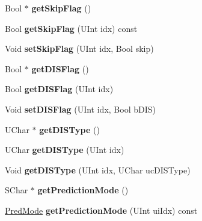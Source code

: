 \begin{DoxyCompactItemize}
Bool $\ast$ {\bfseries get\+Skip\+Flag} ()
\item 
\mbox{\label{class_t_com_data_c_u_a2ca40eaf4b25f2653cfcaebb2034005c}} 
Bool {\bfseries get\+Skip\+Flag} (U\+Int idx) const
\item 
\mbox{\label{class_t_com_data_c_u_a542809bc64c0752d9a9601e2563f80e3}} 
Void {\bfseries set\+Skip\+Flag} (U\+Int idx, Bool skip)
\item 
\mbox{\label{class_t_com_data_c_u_aec1707b6bfb19074fe4b3165bdadc634}} 
Bool $\ast$ {\bfseries get\+D\+I\+S\+Flag} ()
\item 
\mbox{\label{class_t_com_data_c_u_ad683d40e1a296ce1eb42d8e28ce226bb}} 
Bool {\bfseries get\+D\+I\+S\+Flag} (U\+Int idx)
\item 
\mbox{\label{class_t_com_data_c_u_aa9e0848323ae4f659fd9a34863552df4}} 
Void {\bfseries set\+D\+I\+S\+Flag} (U\+Int idx, Bool b\+D\+IS)
\item 
\mbox{\label{class_t_com_data_c_u_a9abe04b2bc042dd44fc2460fe41f188d}} 
U\+Char $\ast$ {\bfseries get\+D\+I\+S\+Type} ()
\item 
\mbox{\label{class_t_com_data_c_u_ae1fd6ba66451437b495f7af5d10c436a}} 
U\+Char {\bfseries get\+D\+I\+S\+Type} (U\+Int idx)
\item 
\mbox{\label{class_t_com_data_c_u_af7f7ce91ef0e3918300daa686f6b44a7}} 
Void {\bfseries get\+D\+I\+S\+Type} (U\+Int idx, U\+Char uc\+D\+I\+S\+Type)
\item 
\mbox{\label{class_t_com_data_c_u_a3c92707b7566306c369b75a2c2558e88}} 
S\+Char $\ast$ {\bfseries get\+Prediction\+Mode} ()
\item 
\mbox{\label{class_t_com_data_c_u_aa54429216a0e66c2bd7aa9cb41aa664d}} 
\hyperlink{_type_def_8h_a33d1666f1cc95252c96e39584255954e}{Pred\+Mode} {\bfseries get\+Prediction\+Mode} (U\+Int ui\+Idx) const
\item 
\mbox{\label{class_t_com_data_c_u_a6997260164e53d1b8cef83170d493ab1}} 

\end{DoxyCompactItemize}
